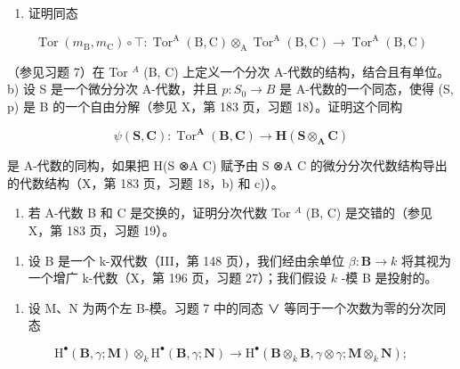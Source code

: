 \begin{enumerate}
\def\labelenumi{\alph{enumi})}
\tightlist
\item
  证明同态
\end{enumerate}

\[
\operatorname{Tor} \left(m _ {\mathrm{B}}, m _ {\mathrm{C}}\right) \circ \top : \operatorname{Tor} ^ {\mathrm{A}} (\mathrm{B}, \mathrm{C}) \otimes_ {\mathrm{A}} \operatorname{Tor} ^ {\mathrm{A}} (\mathrm{B}, \mathrm{C}) \rightarrow \operatorname{Tor} ^ {\mathrm{A}} (\mathrm{B}, \mathrm{C})
\]

（参见习题 7）在 Tor \(^{A}\) (B, C) 上定义一个分次 A-代数的结构，结合且有单位。b) 设 S 是一个微分分次 A-代数，并且 \(p : S_{0} \to B\) 是 A-代数的一个同态，使得 (S, p) 是 B 的一个自由分解（参见 X，第 183 页，习题 18）。证明这个同构

\[
\psi (\mathbf {S}, \mathbf {C}): \operatorname{Tor} ^ {\mathbf {A}} (\mathbf {B}, \mathbf {C}) \rightarrow \mathbf {H} (\mathbf {S} \otimes_ {\mathbf {A}} \mathbf {C})
\]

是 A-代数的同构，如果把 H(S ⊗A C) 赋予由 S ⊗A C 的微分分次代数结构导出的代数结构（X，第 183 页，习题 18，b) 和 c)）。

\begin{enumerate}
\def\labelenumi{\alph{enumi})}
\setcounter{enumi}{2}
\tightlist
\item
  若 A-代数 B 和 C 是交换的，证明分次代数 Tor \(^{A}\) (B, C) 是交错的（参见 X，第 183 页，习题 19）。
\end{enumerate}

\begin{enumerate}
\def\labelenumi{\arabic{enumi})}
\setcounter{enumi}{9}
\tightlist
\item
  设 B 是一个 k-双代数（III，第 148 页），我们经由余单位 \(\beta: \mathbf{B} \to k\) 将其视为一个增广 k-代数（X，第 196 页，习题 27）；我们假设 \(k\) -模 B 是投射的。
\end{enumerate}

\begin{enumerate}
\def\labelenumi{\alph{enumi})}
\tightlist
\item
  设 M、N 为两个左 B-模。习题 7 中的同态 ∨ 等同于一个次数为零的分次同态
\end{enumerate}

\[
\mathrm{H} ^ {\bullet} (\mathbf {B}, \gamma ; \mathbf {M}) \otimes_ {k} \mathrm{H} ^ {\bullet} (\mathbf {B}, \gamma ; \mathbf {N}) \rightarrow \mathrm{H} ^ {\bullet} (\mathbf {B} \otimes_ {k} \mathbf {B}, \gamma \otimes \gamma ; \mathbf {M} \otimes_ {k} \mathbf {N});
\]

